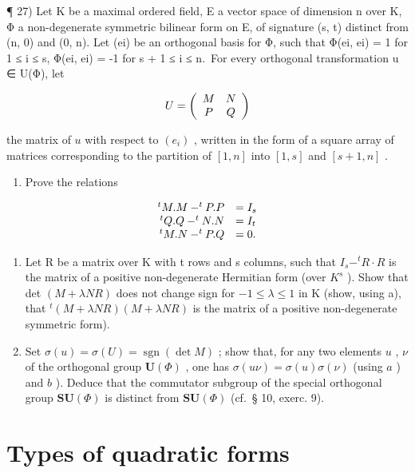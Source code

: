 ¶ 27) Let K be a maximal ordered field, E a vector space of dimension n over K, Φ a non-degenerate symmetric bilinear form on E, of signature (s, t) distinct from (n, 0) and (0, n). Let (ei) be an orthogonal basis for Φ, such that Φ(ei, ei) = 1 for 1 ≤ i ≤ s, Φ(ei, ei) = -1 for s + 1 ≤ i ≤ n.~For every orthogonal transformation u ∈ U(Φ), let

\[
U = \left( \begin{array}{c c} M & N \\ P & Q \end{array} \right)
\]

the matrix of \(u\) with respect to \((e_{i})\) , written in the form of a square array of matrices corresponding to the partition of \([1, n]\) into \([1, s]\) and \([s + 1, n]\) .

\begin{enumerate}
\def\labelenumi{\alph{enumi})}
\tightlist
\item
  Prove the relations
\end{enumerate}

\[
\begin{array}{r l} ^ {t} M. M - ^ {t} P. P & = I _ {s} \\ ^ {t} Q. Q - ^ {t} N. N & = I _ {t} \\ ^ {t} M. N - ^ {t} P. Q & = 0. \end{array}
\]

\begin{enumerate}
\def\labelenumi{\alph{enumi})}
\setcounter{enumi}{1}
\item
  Let R be a matrix over K with t rows and s columns, such that \(I_{s} - ^{t}R \cdot R\) is the matrix of a positive non-degenerate Hermitian form (over \(K^{s}\) ). Show that det \((M + \lambda NR)\) does not change sign for \(-1 \leqslant \lambda \leqslant 1\) in K (show, using a), that \(^{t}(M + \lambda NR)(M + \lambda NR)\) is the matrix of a positive non-degenerate symmetric form).
\item
  Set \(\sigma(u) = \sigma(U) = \operatorname{sgn}(\det M)\) ; show that, for any two elements \(u\) , \(\nu\) of the orthogonal group \(\mathbf{U}(\Phi)\) , one has \(\sigma(u\nu) = \sigma(u)\sigma(\nu)\) (using \(a\) ) and \(b\) ). Deduce that the commutator subgroup of the special orthogonal group \(\mathbf{SU}(\Phi)\) is distinct from \(\mathbf{SU}(\Phi)\) (cf.~§ 10, exerc. 9).
\end{enumerate}

\section{Types of quadratic forms}

